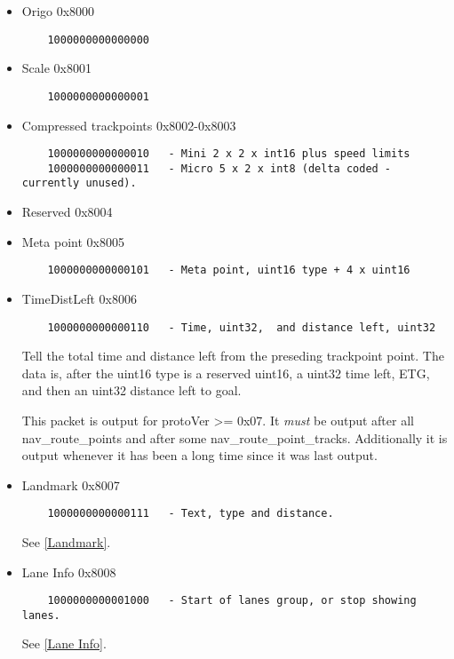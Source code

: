 \documentclass[a4paper]{article}
\begin{document}
\begin{itemize}

 \item Origo 0x8000
    \begin{verbatim}
    1000000000000000
    \end{verbatim}

 \item Scale 0x8001
    \begin{verbatim}
    1000000000000001
    \end{verbatim}

 \item Compressed trackpoints 0x8002-0x8003
    \begin{verbatim}
    1000000000000010   - Mini 2 x 2 x int16 plus speed limits
    1000000000000011   - Micro 5 x 2 x int8 (delta coded - currently unused).
    \end{verbatim}

 \item Reserved 0x8004

 \item Meta point 0x8005
    \begin{verbatim}
    1000000000000101   - Meta point, uint16 type + 4 x uint16
    \end{verbatim}


 \item TimeDistLeft 0x8006
    \begin{verbatim}
    1000000000000110   - Time, uint32,  and distance left, uint32
    \end{verbatim}
 
Tell the total time and distance left from the preseding trackpoint point.
The data is, after the uint16 type is a reserved uint16, a uint32 time left, ETG, 
and then an uint32 distance left to goal.

This packet is output for protoVer >= 0x07. It {\em must} be output 
after all nav\_route\_points and after some nav\_route\_point\_tracks.
Additionally it is output whenever it has been a long time since it was
last output.

 \item Landmark 0x8007
    \begin{verbatim}
    1000000000000111   - Text, type and distance.
    \end{verbatim}
    See \ref{Landmark}.

\item Lane Info 0x8008
    \begin{verbatim}
    1000000000001000   - Start of lanes group, or stop showing lanes.
    \end{verbatim}
    See \ref{Lane Info}.


\end{itemize}
\end{document}
